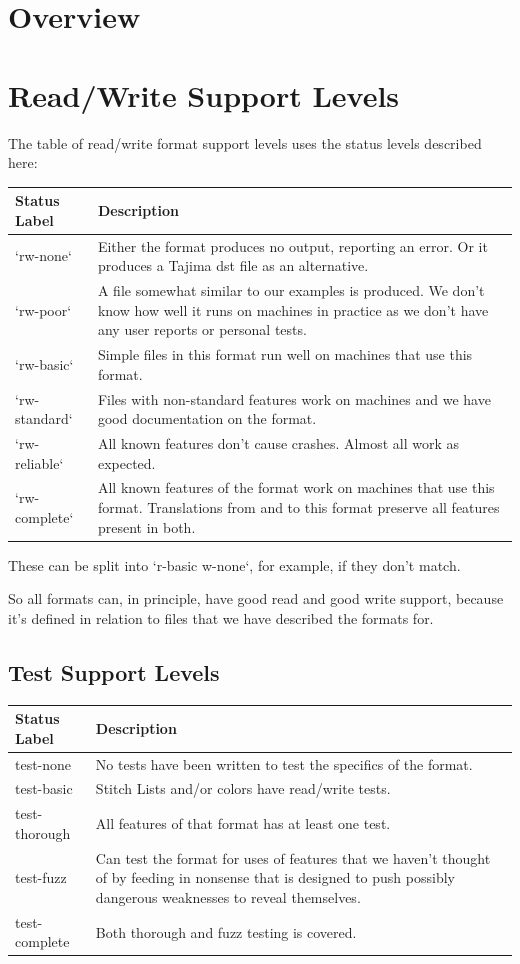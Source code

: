 \documentclass{report}
\begin{document}
\section{Overview}

\section{Read/Write Support Levels}

The table of read/write format support levels uses the status levels described here:

\begin{tabular}{l l}
Status Label & Description \\
\hline
`rw-none` & Either the format produces no output, reporting an error. Or it produces a Tajima dst file as an alternative. \\
`rw-poor` & A file somewhat similar to our examples is produced. We don't know how well it runs on machines in practice as we don't have any user reports or personal tests. \\
`rw-basic` & Simple files in this format run well on machines that use this format. \\
`rw-standard` & Files with non-standard features work on machines and we have good documentation on the format. \\
`rw-reliable` & All known features don't cause crashes. Almost all work as expected. \\
`rw-complete` & All known features of the format work on machines that use this format. Translations from and to this format preserve all features present in both.
\end{tabular}

These can be split into `r-basic w-none`, for example, if they don't match.

So all formats can, in principle, have good read and good write support, because it's defined in relation to files that we have described the formats for.

\subsection{Test Support Levels}

\begin{tabular}{l l}
Status Label & Description \\
\hline
test-none & No tests have been written to test the specifics of the format. \\
test-basic & Stitch Lists and/or colors have read/write tests. \\
test-thorough & All features of that format has at least one test. \\
test-fuzz & Can test the format for uses of features that we haven't thought of by feeding in nonsense that is designed to push possibly dangerous weaknesses to reveal themselves. \\
test-complete & Both thorough and fuzz testing is covered.
\end{tabular}
\end{document}
